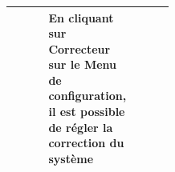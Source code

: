 \setcounter{rowcounter}{1}

\begin{tabular}{|Ep{0.4\linewidth}|p{.5\linewidth}|}
\hline
 & En cliquant sur Correcteur sur le Menu de configuration, il est possible de régler la correction du système
 &
\tabularnewline\hline
\end{tabular}

